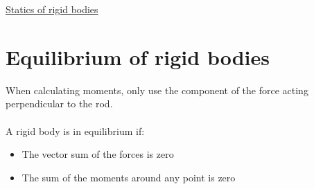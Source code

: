 \documentclass{article}[18pt]
\begin{document}
\begin{center}
\underline{\huge Statics of rigid bodies}
\end{center}
\section{Equilibrium of rigid bodies}
When calculating moments, only use the component of the force acting perpendicular to the rod.\\
\\
A rigid body is in equilibrium if:
\begin{itemize}
\item The vector sum of the forces is zero
\item The sum of the moments around any point is zero
\end{itemize}
\end{document}
